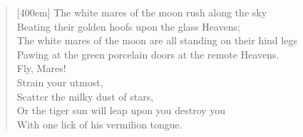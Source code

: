\documentclass{article}
\begin{document}

\settowidth{\versewidth}{At first we hesitated, then we saw her footprints,}
\begin{verse}[400em]
  \Large{The white mares of the moon rush along the sky} \\
  \Large{Beating their golden hoofs upon the glass Heavens;} \\
  \Large{The white mares of the moon are all standing on their hind legs} \\
  \Large{Pawing at the green porcelain doors at the remote Heavens.} \\
  \Large{Fly, Mares!} \\
  \Large{Strain your utmost,} \\
  \Large{Scatter the milky dust of stars,} \\
  \Large{Or the tiger sun will leap upon you destroy you} \\
  \Large{With one lick of his vermilion tongue.} \\
\end{verse}
\end{document}

